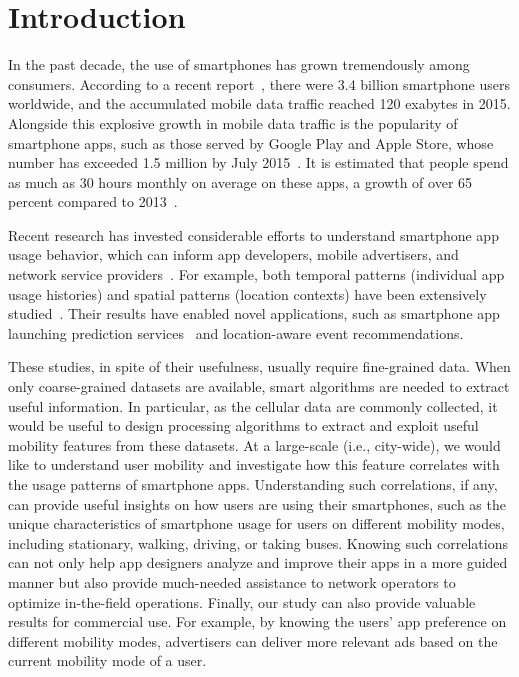 \section{Introduction}\label{intro}

In the past decade, the use of smartphones has grown tremendously among consumers.
According to a recent report~\cite{Ericsson}, there were 3.4 billion smartphone users worldwide,
and the accumulated mobile data traffic reached 120 exabytes in 2015.
Alongside this explosive growth in mobile data traffic is the popularity of smartphone apps, such as those served by Google Play and Apple Store,
whose number has exceeded 1.5 million by July 2015~\cite{Statista}.
It is estimated that people spend as much as 30 hours monthly on average on these apps,
a growth of over 65 percent compared to 2013~\cite{Nielsen}.

Recent research has invested considerable efforts to understand smartphone app usage behavior, which can inform app developers, mobile advertisers, and network service providers~\cite{xu2011identifying,yang2015characterizing}.
For example, both temporal patterns (\eg individual app usage histories) and
spatial patterns (\eg location contexts) have been extensively studied~\cite{meng2014analyzing}.
Their results have enabled novel applications,
such as smartphone app launching prediction services~\cite{yan2012fast}
and location-aware event recommendations.

These studies, in spite of their usefulness, usually require fine-grained data. 
When only coarse-grained datasets are available, smart algorithms are needed to extract useful information. %
In particular, as the cellular data are commonly collected, 
it would be useful to design processing algorithms to extract and exploit useful mobility features 
from these datasets. 
At a large-scale (i.e., city-wide), we 
would like to understand user mobility and investigate how this feature correlates with the usage patterns of smartphone apps.
Understanding such correlations, if any, can provide useful insights on how users are using their smartphones, such as the unique characteristics of smartphone usage for users on different mobility modes, including stationary, walking, driving, or taking buses. Knowing such correlations can not only help app designers analyze and improve their apps in a more guided manner but also provide much-needed assistance to network operators to optimize in-the-field operations. Finally, our study can also provide valuable results for commercial use. For example, by knowing the users' app preference on different mobility modes, advertisers can deliver more relevant ads %
based on the current mobility mode of a user. %


